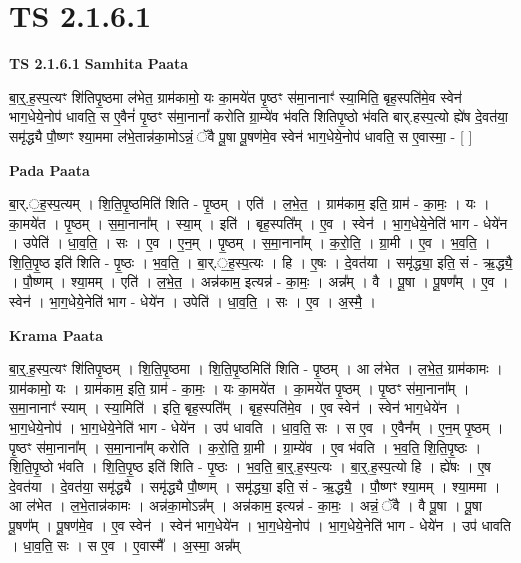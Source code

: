 \documentclass[17pt]{extarticle}
\begin{document}
\section{ TS 2.1.6.1 }

\textbf{TS 2.1.6.1 } \newline
\textbf{Samhita Paata} \newline

बा॒र्॒.ह॒स्प॒त्यꣳ शि॑तिपृ॒ष्ठमा ल॑भेत॒ ग्राम॑कामो॒ यः का॒मये॑त पृ॒ष्ठꣳ स॑मा॒नानाꣳ॑ स्या॒मिति॒ बृह॒स्पति॑मे॒व स्वेन॑ भाग॒धेये॒नोप॑ धावति॒ स ए॒वैनं॑ पृ॒ष्ठꣳ स॑मा॒नानां᳚ करोति ग्रा॒म्ये॑व भ॑वति शितिपृ॒ष्ठो भ॑वति बार्.हस्प॒त्यो ह्ये॑ष दे॒वत॑या॒ समृ॑द्ध्यै पौ॒ष्णꣳ श्या॒ममा ल॑भे॒तान्न॑का॒मोऽन्नं॒ ॅवै पू॒षा पू॒षण॑मे॒व स्वेन॑ भाग॒धेये॒नोप॑ धावति॒ स ए॒वास्मा॒ - [  ] \newline

\textbf{Pada Paata} \newline

बा॒र्.॒ह॒स्प॒त्यम् । शि॒ति॒पृ॒ष्ठमिति॑ शिति - पृ॒ष्ठम् । एति॑ । ल॒भे॒त॒ । ग्राम॑काम॒ इति॒ ग्राम॑ - का॒मः॒ । यः । का॒मये॑त । पृ॒ष्ठम् । स॒मा॒नाना᳚म् । स्या॒म् । इति॑ । बृह॒स्पति᳚म् । ए॒व । स्वेन॑ । भा॒ग॒धेये॒नेति॑ भाग - धेये॑न । उपेति॑ । धा॒व॒ति॒ । सः । ए॒व । ए॒न॒म् । पृ॒ष्ठम् । स॒मा॒नाना᳚म् । क॒रो॒ति॒ । ग्रा॒मी । ए॒व । भ॒व॒ति॒ । शि॒ति॒पृ॒ष्ठ इति॑ शिति - पृ॒ष्ठः । भ॒व॒ति॒ । बा॒र्.॒ह॒स्प॒त्यः । हि । ए॒षः । दे॒वत॑या । समृ॑द्ध्या॒ इति॒ सं - ऋ॒द्ध्यै॒ । पौ॒ष्णम् । श्या॒मम् । एति॑ । ल॒भे॒त॒ । अन्न॑काम॒ इत्यन्न॑ - का॒मः॒ । अन्न᳚म् । वै । पू॒षा । पू॒षण᳚म् । ए॒व । स्वेन॑ । भा॒ग॒धेये॒नेति॑ भाग - धेये॑न । उपेति॑ । धा॒व॒ति॒ । सः । ए॒व । अ॒स्मै॒ ।  \newline


\textbf{Krama Paata} \newline

बा॒र्॒.ह॒स्प॒त्यꣳ शि॑तिपृ॒ष्ठम् । शि॒ति॒पृ॒ष्ठमा । शि॒ति॒पृ॒ष्ठमिति॑ शिति - पृ॒ष्ठम् । आ ल॑भेत । ल॒भे॒त॒ ग्राम॑कामः । ग्राम॑कामो॒ यः । ग्राम॑काम॒ इति॒ ग्राम॑ - का॒मः॒ । यः का॒मये॑त । का॒मये॑त पृ॒ष्ठम् । पृ॒ष्ठꣳ स॑मा॒नाना᳚म् । स॒मा॒नानाꣳ॑ स्याम् । स्या॒मिति॑ । इति॒ बृह॒स्पति᳚म् । बृह॒स्पति॑मे॒व । ए॒व स्वेन॑ । स्वेन॑ भाग॒धेये॑न । भा॒ग॒धेये॒नोप॑ । भा॒ग॒धेये॒नेति॑ भाग - धेये॑न । उप॑ धावति । धा॒व॒ति॒ सः । स ए॒व । ए॒वैन᳚म् । ए॒न॒म् पृ॒ष्ठम् । पृ॒ष्ठꣳ स॑मा॒नाना᳚म् । स॒मा॒नाना᳚म् करोति । क॒रो॒ति॒ ग्रा॒मी । ग्रा॒म्ये॑व । ए॒व भ॑वति । भ॒व॒ति॒ शि॒ति॒पृ॒ष्ठः । शि॒ति॒पृ॒ष्ठो भ॑वति । शि॒ति॒पृ॒ष्ठ इति॑ शिति - पृ॒ष्ठः । भ॒व॒ति॒ बा॒र्॒.ह॒स्प॒त्यः । बा॒र्॒.ह॒स्प॒त्यो हि । ह्ये॑षः । ए॒ष दे॒वत॑या । दे॒वत॑या॒ समृ॑द्ध्यै । समृ॑द्ध्यै पौ॒ष्णम् । समृ॑द्ध्या॒ इति॒ सं - ऋ॒द्ध्यै॒ । पौ॒ष्णꣳ श्या॒मम् । श्या॒ममा । आ ल॑भेत । ल॒भे॒तान्न॑कामः । अन्न॑का॒मोऽन्न᳚म् । अन्न॑काम॒ इत्यन्न॑ - का॒मः॒ । अन्नं॒ ॅवै । वै पू॒षा । पू॒षा पू॒षण᳚म् । पू॒षण॑मे॒व । ए॒व स्वेन॑ । स्वेन॑ भाग॒धेये॑न । भा॒ग॒धेये॒नोप॑ । भा॒ग॒धेये॒नेति॑ भाग - धेये॑न । उप॑ धावति । धा॒व॒ति॒ सः । स ए॒व । ए॒वास्मै᳚ । अ॒स्मा॒ अन्न᳚म् \newline
\end{document}
